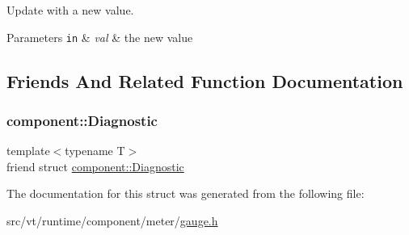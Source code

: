 Update with a new value. 


\begin{DoxyParams}[1]{Parameters}
\mbox{\tt in}  & {\em val} & the new value \\
\hline
\end{DoxyParams}


\subsection{Friends And Related Function Documentation}
\mbox{\label{structvt_1_1runtime_1_1component_1_1meter_1_1_gauge_a48f263de9dbf26c1fc7736031cca9613}} 
\subsubsection{\texorpdfstring{component\+::\+Diagnostic}{component::Diagnostic}}
{\footnotesize\ttfamily template$<$typename T$>$ \\
friend struct \hyperlink{structvt_1_1runtime_1_1component_1_1_diagnostic}{component\+::\+Diagnostic}\hspace{0.3cm}{\ttfamily [friend]}}



The documentation for this struct was generated from the following file\+:\begin{DoxyCompactItemize}
\item 
src/vt/runtime/component/meter/\hyperlink{gauge_8h}{gauge.\+h}\end{DoxyCompactItemize}
